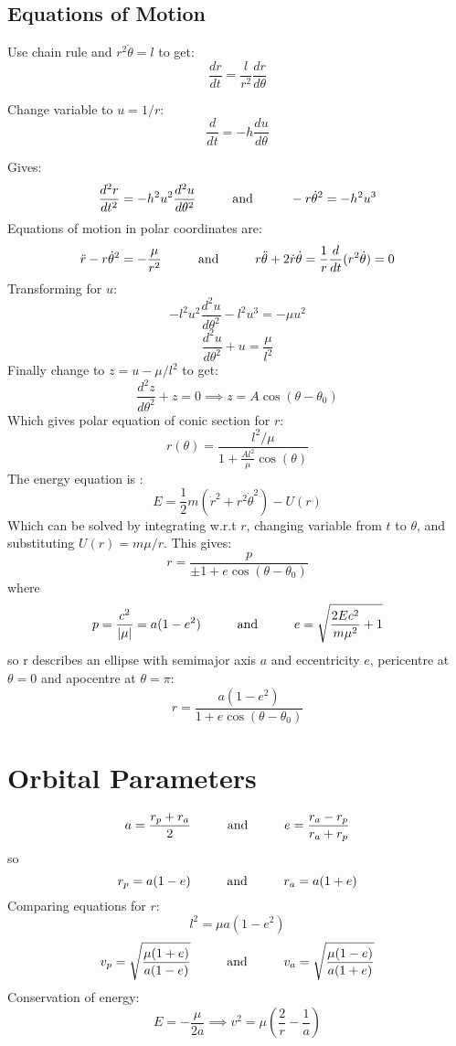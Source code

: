 \documentclass[table,cmyk]{article}
\begin{document}
\begin{longtable}
\subsection*{Equations of Motion}
Use chain rule and $r^2\dot{\theta} = l$ to get:
\[\frac{dr}{dt} = \frac{l}{r^2}\frac{dr}{d\theta}\]

Change variable to $u = 1/r$:
\[\frac{d}{dt} = -h \frac{du}{d\theta}\]

Gives:
\[\frac{d^2r}{dt^2} = -h^2u^2\frac{d^2u}{d\theta^2}\text{\hspace{1cm}and\hspace{1cm}} -r\dot{\theta}^2 = -h^2u^3\]
Equations of motion in polar coordinates are:
\[\ddot{r} - r\dot{\theta}^2 = -\frac{\mu}{r^2}\text{\hspace{1cm}and\hspace{1cm}}r\ddot{\theta}+2\dot{r}\dot{\theta} = \frac{1}{r}\frac{d}{dt}(r^2\dot{\theta})=0\]
Transforming for $u$:
\[-l^2u^2\frac{d^2u}{d\theta^2}-l^2u^3 = -\mu u^2\]
\[\frac{d^2u}{d\theta^2}+u = \frac{\mu}{l^2}\]
Finally change to $z = u-\mu/l^2$ to get:
\[\frac{d^2z}{d\theta^2}+z = 0 \implies z = A\cos(\theta-\theta_0)\]
Which gives polar equation of conic section for $r$:
\[r(\theta) = \frac{l^2/\mu}{1+\frac{Al^2}{\mu}\cos(\theta)}\]
The energy equation is :
\[E = \frac{1}{2}m(\dot{r}^2+r^2\dot{\theta}^2)-U(r)\]
Which can be solved by integrating w.r.t $r$, changing variable from $t$ to $\theta$, and substituting $U(r) = m\mu/r$. This gives:
\[r = \frac{p}{\pm1+e\cos(\theta-\theta_0)}\]
where
\[p = \frac{c^2}{|\mu|}=a(1-e^2)\text{\hspace{1cm}and\hspace{1cm}}e = \sqrt{\frac{2Ec^2}{m\mu^2}+1}\]
so r describes an ellipse with semimajor axis $a$ and eccentricity $e$, pericentre at $\theta=0$ and apocentre at $\theta=\pi$:
\[r = \frac{a(1-e^2)}{1+e\cos(\theta-\theta_0)}\]



\vspace{4cm}


\tabularnewline\hline
\section*{Orbital Parameters}
\[a=\frac{r_p+r_a}{2}\text{\hspace{1cm}and\hspace{1cm}}e=\frac{r_a-r_p}{r_a+r_p}\]
so
\[r_p=a(1-e)\text{\hspace{1cm}and\hspace{1cm}}r_a=a(1+e)\]
Comparing equations for $r$:
\[l^2 = \mu a(1-e^2)\]
\[v_p = \sqrt{\frac{\mu(1+e)}{a(1-e)}}\text{\hspace{1cm}and\hspace{1cm}}v_a = \sqrt{\frac{\mu(1-e)}{a(1+e)}}\]
Conservation of energy:
\[E = -\frac{\mu}{2a} \implies v^2 = \mu\left(\frac{2}{r}-\frac{1}{a}\right)\]

\end{longtable}
\end{document}
